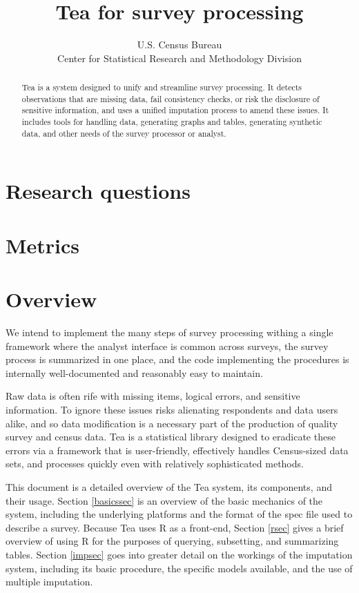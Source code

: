 \documentclass{article}
\begin{document}
\author{U.S. Census Bureau\\Center for Statistical Research and Methodology Division}
\title{Tea for survey processing}
\maketitle

\begin{abstract}
Tea is a system designed to unify and streamline survey processing.  It detects
observations that are missing data, fail consistency checks, or risk the disclosure
of sensitive information, and uses a unified imputation process to amend these issues.
It includes tools for handling data, generating graphs and tables, generating synthetic
data, and other needs of the survey processor or analyst.
\end{abstract}

\section{Research questions}

\section{Metrics}

\section{Overview}
{\sc We intend} to implement the many steps of survey processing withing a single
framework where the analyst interface is common across surveys, the survey process
is summarized in one place, and the code implementing the procedures is internally
well-documented and reasonably easy to maintain.

Raw data is often rife with missing items, logical errors, and sensitive information.
To ignore these issues risks alienating respondents and data users alike, and so data
modification is a necessary part of the production of quality survey and census data.
Tea is a statistical library designed to eradicate these errors via a framework
that is user-friendly, effectively handles Census-sized data sets, and processes
quickly even with relatively sophisticated methods.

This document is a detailed overview of the Tea system, its components, and their usage.
Section \ref{basicssec} is an overview of the basic mechanics of the system, including the
underlying platforms and the format of the spec file used to describe a survey.
Because Tea uses R as a front-end, Section \ref{rsec} gives a brief overview of using R
for the purposes of querying, subsetting, and summarizing tables.
Section \ref{impsec} goes into greater detail on the workings of the imputation system,
including its basic procedure, the specific models available, and the use of multiple imputation.
\end{document}
